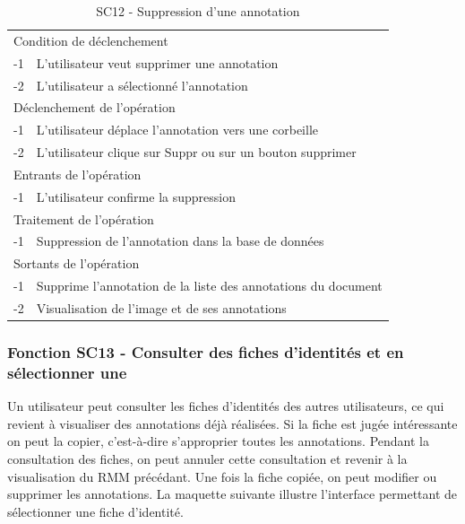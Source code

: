 \documentclass[a4paper]{article}
\begin{document}
\begin{table}[H]
  \centering
   \small
	\begin{tabular}{|c|p{12cm}|}
   		\hline
   			\rowcolor{lightgray}\multicolumn{2}{|c|}{\textbf{SC12 - Suppression d'une annotation}} \\
   		\hline
   			\multicolumn{2}{|l|}{Condition de d\'eclenchement} \\
   		\hline
   			-1 & L’utilisateur veut supprimer une annotation\\
			-2 & L’utilisateur a sélectionné l’annotation\\
   		\hline
   			\multicolumn{2}{|l|}{D\'eclenchement de l'op\'eration} \\
   		\hline
   			-1 & L’utilisateur déplace l’annotation vers une corbeille\\
			-2 & L’utilisateur clique sur Suppr ou sur un bouton supprimer\\
   		\hline
   			\multicolumn{2}{|l|}{Entrants de l'op\'eration} \\
   		\hline
   			-1 & L’utilisateur confirme la suppression\\
   		\hline
   			\multicolumn{2}{|l|}{Traitement de l'op\'eration} \\
  		\hline
   			-1 & Suppression de l’annotation dans la base de données\\
   		\hline
   			\multicolumn{2}{|l|}{Sortants de l'op\'eration} \\
   		\hline
   			-1 & Supprime l’annotation de la liste des annotations du document\\
			-2 & Visualisation de l’image et de ses annotations\\
   		\hline
	\end{tabular}
  \caption{SC12 - Suppression d'une annotation}
  \normalsize
  \label{tab:supprimer_annotation}
\end{table}

\subsubsection{Fonction SC13 - Consulter des fiches d’identités et en sélectionner une}
Un utilisateur peut consulter les fiches d’identités des autres utilisateurs, ce qui revient à visualiser des annotations déjà réalisées. Si la fiche est jugée intéressante on peut la copier, c’est-à-dire s’approprier toutes les annotations. Pendant la consultation des fiches, on peut annuler cette consultation et revenir à la visualisation du RMM précédant. Une fois la fiche copiée, on peut modifier ou supprimer les annotations.
La maquette suivante illustre l’interface permettant de sélectionner une fiche d’identité.\\
\end{document}
